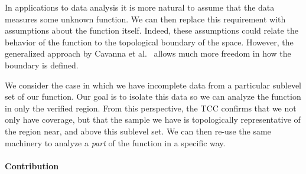 In applications to data analysis it is more natural to assume that the data measures some unknown function.
We can then replace this requirement with assumptions about the function itself.
Indeed, these assumptions could relate the behavior of the function to the topological boundary of the space.
However, the generalized approach by Cavanna et al.~\cite{cavanna2017when} allows much more freedom in how the boundary is defined.

We consider the case in which we have incomplete data from a particular sublevel set of our function.
Our goal is to isolate this data so we can analyze the function in only the verified region.
From this perspective, the TCC confirms that we not only have coverage, but that the sample we have is topologically representative of the region near, and above this sublevel set.
We can then re-use the same machinery to analyze a \emph{part} of the function in a specific way.

\paragraph*{Contribution}

